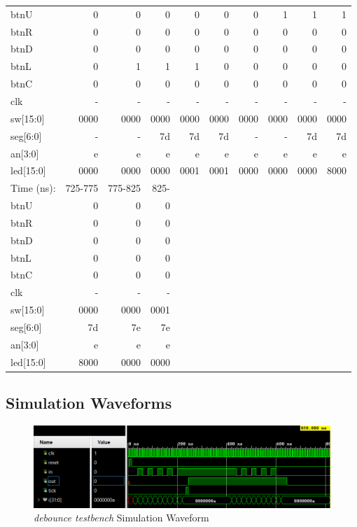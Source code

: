 \documentclass[11pt]{article}
\begin{document}
\begin{table}[ht]
\begin{tabular}{l|rrrrrrrrr}
		\midrule
		btnU & 0  & 0 & 0 & 0 & 0 & 0 & 1 & 1 & 1   \\
		btnR & 0  & 0 & 0 & 0 & 0 & 0 & 0 & 0 & 0 \\
		btnD & 0  & 0 & 0 & 0 & 0 & 0 & 0 & 0 & 0   \\
		btnL & 0  & 1 & 1 & 1 & 0 & 0 & 0 & 0 & 0  \\
		btnC & 0  & 0 & 0 & 0 & 0 & 0 & 0 & 0 & 0  \\
		clk & - & - & - & - & - & - & - & - & -   \\
		sw[15:0] & 0000 & 0000 & 0000 & 0000 & 0000 & 0000 & 0000 & 0000 & 0000   \\
		\midrule
		seg[6:0] & - & - & 7d & 7d  & 7d & - & - & 7d & 7d  \\
		an[3:0] & e & e & e & e & e & e & e & e & e \\
		led[15:0] & 0000 & 0000 & 0000 & 0001 & 0001 & 0000 & 0000 & 0000 & 8000 \\
		\midrule
		Time (ns): & 725-775 & 775-825 & 825-   \\
		\midrule
		btnU & 0  & 0 & 0 \\
		btnR & 0  & 0 & 0 \\
		btnD & 0  & 0 & 0 \\
		btnL & 0  & 0 & 0 \\
		btnC & 0  & 0 & 0 \\
		clk & - & - & -\\
		sw[15:0] & 0000 & 0000 & 0001 \\
		\midrule
		seg[6:0] & 7d & 7e & 7e \\
		an[3:0] & e & e & e  \\
		led[15:0] & 8000 & 0000 & 0000 \\
		\bottomrule
	\end{tabular}
\end{table}

\clearpage
 
\subsection*{Simulation Waveforms}
\begin{figure}[ht]\centering
	\includegraphics[width=1.1\textwidth]{debouncetest}
	\caption{\textit{debounce testbench} Simulation Waveform}
	\label{fig:sim_with_table}
\end{figure}
\end{document}
